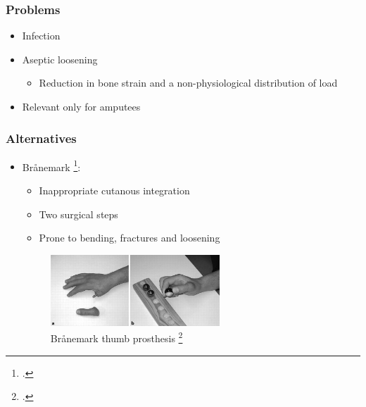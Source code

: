 \begin{frame}
    \frametitle{Problems}

    \begin{itemize}
        \item Infection
        \item Aseptic loosening \begin{itemize}
            \item Reduction in bone strain and a non-physiological distribution of load
        \end{itemize}
        \item Relevant only for amputees
    \end{itemize}

\end{frame}

\begin{frame}
    \frametitle{Alternatives}

    \begin{itemize}
        \item Brånemark \footcite{KANG20101130}: \begin{itemize}
            \item Inappropriate cutanous integration
            \item Two surgical steps
            \item Prone to bending, fractures and loosening
        \end{itemize}
        \begin{figure}[h]
        \centering
            \includegraphics[width=0.6\textwidth]{figures/branemark-thumb.png}
        \caption{{ Brånemark thumb prosthesis \footcite{Li2017Branemark} }}
        \end{figure}
    \end{itemize}

\end{frame}